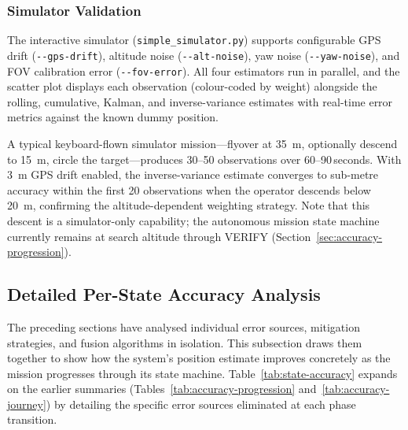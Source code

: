 \subsubsection{Simulator Validation}

The interactive simulator (\texttt{simple\_simulator.py}) supports configurable GPS drift (\texttt{-{}-gps-drift}), altitude noise (\texttt{-{}-alt-noise}), yaw noise (\texttt{-{}-yaw-noise}), and FOV calibration error (\texttt{-{}-fov-error}).  All four estimators run in parallel, and the scatter plot displays each observation (colour-coded by weight) alongside the rolling, cumulative, Kalman, and inverse-variance estimates with real-time error metrics against the known dummy position.

A typical keyboard-flown simulator mission---flyover at \SI{35}{\metre}, optionally descend to \SI{15}{\metre}, circle the target---produces 30--50 observations over 60--90\,seconds.  With \SI{3}{\metre} GPS drift enabled, the inverse-variance estimate converges to sub-metre accuracy within the first 20 observations when the operator descends below \SI{20}{\metre}, confirming the altitude-dependent weighting strategy.  Note that this descent is a simulator-only capability; the autonomous mission state machine currently remains at search altitude through VERIFY (Section~\ref{sec:accuracy-progression}).

\subsection{Detailed Per-State Accuracy Analysis}\label{sec:detailed-accuracy}

The preceding sections have analysed individual error sources, mitigation strategies, and fusion algorithms in isolation.  This subsection draws them together to show how the system's position estimate improves concretely as the mission progresses through its state machine.  Table~\ref{tab:state-accuracy} expands on the earlier summaries (Tables~\ref{tab:accuracy-progression} and~\ref{tab:accuracy-journey}) by detailing the specific error sources eliminated at each phase transition.

